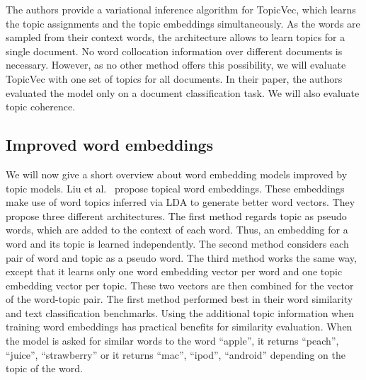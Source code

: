 \documentclass[
        a4paper,
        titlepage,
        twoside,
        parskip,
        numbers=noenddot
        ]{scrbook}
\theoremstyle{break}
\begin{document}
The authors provide a variational inference algorithm for TopicVec, which learns the topic assignments and the topic embeddings simultaneously.
As the words are sampled from their context words, the architecture allows to learn topics for a single document.
No word collocation information over different documents is necessary.
However, as no other method offers this possibility, we will evaluate TopicVec with one set of topics for all documents.
In their paper, the authors evaluated the model only on a document classification task.
We will also evaluate topic coherence.



\subsection{Improved word embeddings}
We will now give a short overview about word embedding models improved by topic models.
Liu et al.~\cite{Liu2015} propose topical word embeddings.
These embeddings make use of word topics inferred via LDA to generate better word vectors.
They propose three different architectures.
The first method regards topic as pseudo words, which are added to the context of each word.
Thus, an embedding for a word and its topic is learned independently.
The second method considers each pair of word and topic as a pseudo word.
The third method works the same way, except that it learns only one word embedding vector per word and one topic embedding vector per topic.
These two vectors are then combined for the vector of the word-topic pair.
The first method performed best in their word similarity and text classification benchmarks.
Using the additional topic information when training word embeddings has practical benefits for similarity evaluation.
When the model is asked for similar words to the word ``apple'', it returns ``peach'', ``juice'', ``strawberry'' or it returns ``mac'', ``ipod'', ``android'' depending on the topic of the word.
\end{document}
